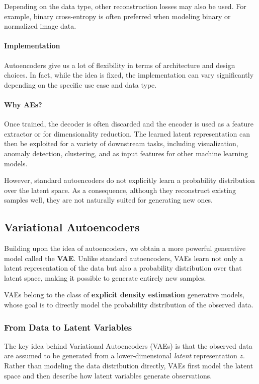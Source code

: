 Depending on the data type, other reconstruction losses may also be used. For example, binary cross-entropy is often preferred when modeling binary or normalized image data.

\paragraph{Implementation}
Autoencoders give us a lot of flexibility in terms of architecture and design choices. In fact, while the idea is fixed, 
the implementation can vary significantly depending on the specific use case and data type.


\paragraph{Why AEs?}
Once trained, the decoder is often discarded and the encoder is used as a feature extractor or for dimensionality reduction. The learned latent representation can then be exploited for a variety of downstream tasks, including visualization, anomaly detection, clustering, and as input features for other machine learning models.

However, standard autoencoders do not explicitly learn a probability distribution over the latent space. As a consequence, although they reconstruct existing samples well, they are not naturally suited for generating new ones.


\subsection{Variational Autoencoders}

Building upon the idea of autoencoders, we obtain a more powerful generative model called the \textbf{VAE}. Unlike standard autoencoders, VAEs learn not only a latent representation of the data but also a probability distribution over that latent space, making it possible to generate entirely new samples.

VAEs belong to the class of \textbf{explicit density estimation} generative models, whose goal is to directly model the probability distribution of the observed data.

\subsubsection{From Data to Latent Variables}

The key idea behind Variational Autoencoders (VAEs) is that the observed data are assumed to be generated from a lower-dimensional \emph{latent} representation $z$. Rather than modeling the data distribution directly, VAEs first model the latent space and then describe how latent variables generate observations.

